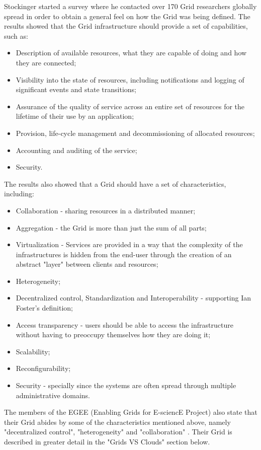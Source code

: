 Stockinger started a survey where he contacted over 170 Grid researchers globally spread in order to obtain a general feel on how the Grid was being defined. The results showed that the Grid infrastructure should provide a set of capabilities, such as:
\begin{itemize}
\item Description of available resources, what they are capable of doing and how they are connected;
\item Visibility into the state of resources, including notifications and logging of significant events  and state transitions;
\item Assurance of the quality of service across an entire set of resources for the lifetime of their use by an application;
\item Provision, life-cycle management and decommissioning of allocated resources;
\item Accounting and auditing of the service;
\item Security.
\end{itemize}

The results also showed that a Grid should have a set of characteristics, including:
\begin{itemize}
\item Collaboration - sharing resources in a distributed manner;
\item Aggregation - the Grid is more than just the sum of all parts;
\item Virtualization - Services are provided in a way that the complexity of the infrastructures is hidden from the end-user through the creation of an abstract "layer" between clients and resources;
\item Heterogeneity;
\item Decentralized control, Standardization and Interoperability - supporting Ian Foster's definition;
\item Access transparency - users should be able to access the infrastructure without having to preoccupy themselves how they are doing it;
\item Scalability; 
\item Reconfigurability;
\item Security - specially since the systems are often spread through multiple administrative domains. \cite{stockinger}
\end{itemize}

The members of the EGEE (Enabling Grids for E-sciencE Project) also state that their Grid abides by some of the characteristics mentioned above, namely "decentralized control", "heterogeneity" and "collaboration" \cite{grids-and-clouds}. Their Grid is described in greater detail in the "Grids VS Clouds" section below. 

